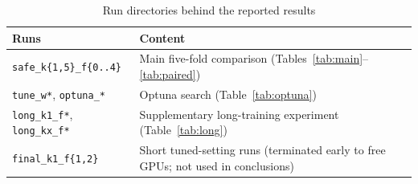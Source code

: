 \begin{table}[htbp]\centering\small
\caption{Run directories behind the reported results}\label{tab:runs}
\begin{tabular}{p{4.2cm}p{9.6cm}}\toprule
\textbf{Runs} & \textbf{Content}\\\midrule
\texttt{safe\_k\{1,5\}\_f\{0..4\}} & Main five-fold comparison (Tables~\ref{tab:main}--\ref{tab:paired})\\
\texttt{tune\_w*}, \texttt{optuna\_*} & Optuna search (Table~\ref{tab:optuna})\\
\texttt{long\_k1\_f*}, \texttt{long\_kx\_f*} & Supplementary long-training experiment (Table~\ref{tab:long})\\
\texttt{final\_k1\_f\{1,2\}} & Short tuned-setting runs (terminated early to free GPUs; not used in conclusions)\\\bottomrule
\end{tabular}
\end{table}


